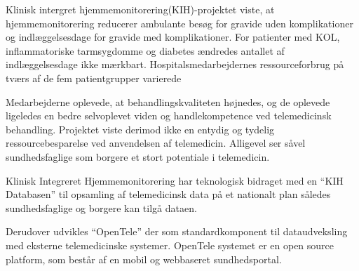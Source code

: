 	\textquotedbl Klinisk intergret hjemmemonitorering(KIH)-projektet viste, at hjemmemonitorering reducerer ambulante besøg for gravide uden komplikationer og indlæggelsesdage for gravide med komplikationer. For patienter med KOL, inflammatoriske tarmsygdomme og diabetes ændredes antallet af indlæggelsesdage ikke mærkbart. Hospitalsmedarbejdernes ressourceforbrug på tværs af de fem patientgrupper varierede\textquotedbl \cite{Lee2015} 


	\textquotedbl Medarbejderne oplevede, at behandlingskvaliteten højnedes, og de oplevede ligeledes en bedre selvoplevet viden og handlekompetence ved telemedicinsk behandling. Projektet viste derimod ikke en entydig og tydelig ressourcebesparelse ved anvendelsen af telemedicin. Alligevel ser såvel sundhedsfaglige som borgere et stort potentiale i telemedicin.\textquotedbl \cite{Lee2015}


Klinisk Integreret Hjemmemonitorering har teknologisk bidraget med en “KIH Databasen” til opsamling af telemedicinsk data på et nationalt plan således sundhedsfaglige og borgere kan tilgå dataen. 


Derudover udvikles “OpenTele” der som standardkomponent til dataudveksling med eksterne telemedicinske systemer. OpenTele systemet er en open source platform, som består af en mobil og webbaseret sundhedsportal.

 